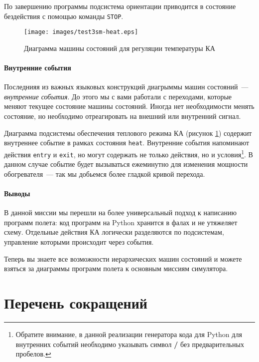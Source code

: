 \documentclass[12pt,a4paper]{article}
\begin{document}
По завершению программы подсистема ориентации приводится в состояние бездействия с помощью
команды \verb'STOP'.

\begin{figure}[tbh]
  \begin{center}
    \texttt{[image: images/test3sm-heat.eps]}
    \caption{Диаграмма машины состояний для регуляции температуры КА}
    \label{Pic:Test3SM-Heat}
  \end{center}
\end{figure}

\paragraph{Внутренние события}

Последнияя из важных языковых конструкций диагрыммы машин состояний~--- \emph{внутренние
  события}. До этого мы с вами работали с переходами, которые меняют текущее состояние машины
состояний. Иногда нет необходимости менять состояние, но необходимо отреагировать на
внешний или внутренний сигнал.

Диаграмма подсистемы обеспечения теплового режима КА (рисунок \ref{Pic:Test3SM-Heat})
содержит внутреннее событие в рамках состояния \verb'heat'. Внутренние события напоминают
действия \verb'entry' и \verb'exit', но могут содержать не только действия, но и
условия\footnote{Обратите внимание, в данной реализации генератора кода для Python для
  внутренних событий необходимо указывать символ \textbf{/} без предварительных
  пробелов.}. В данном случае событие будет вызываться ежеминутно для изменения мощности
обогревателя~--- так мы добьемся более гладкой кривой перехода.  

\paragraph{Выводы}

В данной миссии мы перешли на более универсальный подход к написанию программ полета: код
программ на Python хранится в фалах и не утяжеляет схему. Отдельные действия КА
логически разделяются по подсистемам, управление которыми происходит через события.

Теперь вы знаете все возможности иерархических машин состояний и можете взяться за
диаграммы программ полета к основным миссиям симулятора.

\section*{Перечень сокращений}
\end{document}
